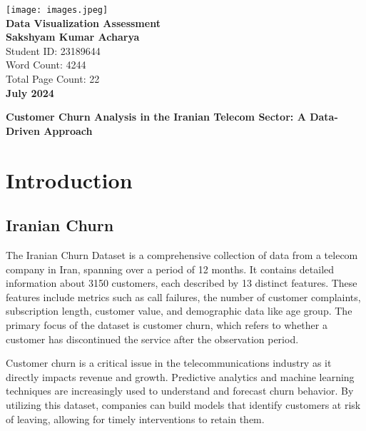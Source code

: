 \documentclass[12pt]{article}
\begin{document}
\begin{titlepage}
    \centering
    \texttt{[image: images.jpeg]} \\[1cm] %
    
    {\LARGE \textbf{Data Visualization Assessment}} \\[1cm]
    
    \textbf{Sakshyam Kumar Acharya} \\
    Student ID: 23189644 \\[0.5cm]
    
    Word Count: 4244 \\ 
    Total Page Count: 22 \\[1cm]
    
    \textbf{July 2024}
    
\end{titlepage}




\newpage %
\tableofcontents %
\newpage
\listoffigures %
\newpage


\newpage 
\begin{center}

    \LARGE \textbf{Customer Churn Analysis 
    in the Iranian Telecom Sector: A Data-Driven Approach}
\end{center}

\section{Introduction}

\subsection{Iranian Churn}
The Iranian Churn Dataset is a comprehensive collection of data from a telecom company in Iran, spanning over a period of 12 months. It contains detailed information about 3150 customers, each described by 13 distinct features. These features include metrics such as call failures, the number of customer complaints, subscription length, customer value, and demographic data like age group. The primary focus of the dataset is customer churn, which refers to whether a customer has discontinued the service after the observation period.

Customer churn is a critical issue in the telecommunications industry as it directly impacts revenue and growth. Predictive analytics and machine learning techniques are increasingly used to understand and forecast churn behavior. By utilizing this dataset, companies can build models that identify customers at risk of leaving, allowing for timely interventions to retain them.
\end{document}
